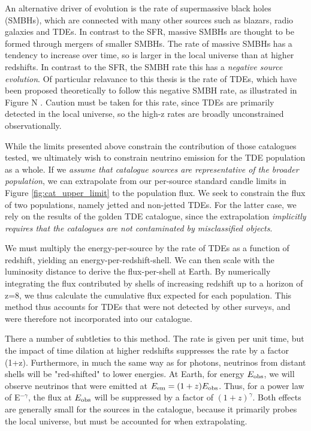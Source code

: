 An alternative driver of evolution is the rate of supermassive black holes (SMBHs), which are connected with many other sources such as blazars, radio galaxies and TDEs. In contrast to the SFR, massive SMBHs are thought to be formed through mergers of smaller SMBHs. The rate of massive SMBHs has a tendency to increase over time, so is larger in the local universe than at higher redshifts. In contrast to the SFR, the SMBH rate this has a \emph{negative source evolution}. Of particular relavance to this thesis is the rate of TDEs, which have been proposed theoretically to follow this negative SMBH rate, as illustrated in Figure N . Caution must be taken for this rate, since TDEs are primarily detected in the local universe, so the high-z rates are broadly unconstrained observationally.

While the limits presented above constrain the contribution of those catalogues tested, we ultimately wish to constrain neutrino emission for the TDE population as a whole. If we \emph{assume that catalogue sources are representative of the broader population}, we can extrapolate from our per-source standard candle limits in Figure \ref{fig:cat_upper_limit} to the population flux. We seek to constrain the flux of two populations, namely jetted and non-jetted TDEs. For the latter case, we rely on the results of the golden TDE catalogue, since the extrapolation \emph{implicitly requires that the catalogues are not contaminated by misclassified objects}.

We must multiply the energy-per-source by the rate of TDEs as a function of redshift, yielding an energy-per-redshift-shell. We can then scale with the luminosity distance to derive the flux-per-shell at Earth. By numerically integrating the flux contributed by shells of increasing redshift up to a horizon of z=8, we thus calculate the cumulative flux expected for each population. This method thus accounts for TDEs that were not detected by other surveys, and were therefore not incorporated into our catalogue. 

There a number of subtleties to this method. The rate is given per unit time, but the impact of time dilation at higher redshifts suppresses the rate by a factor (1+z). Furthermore, in much the same way as for photons, neutrinos from distant shells will be "red-shifted" to lower energies. At Earth, for energy $E_{\textup{obs}}$, we will observe neutrinos that were emitted at $E_{\textup{em}} = (1+z) E_{\textup{obs}}$. Thus, for a power law of E$^{-\gamma}$, the flux at $E_{\textup{obs}}$ will be suppressed by a factor of $(1+z) ^{\gamma}$. Both effects are generally small for the sources in the catalogue, because it primarily probes the local universe, but must be accounted for when extrapolating.

